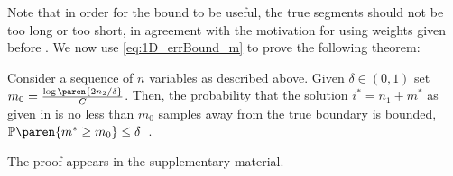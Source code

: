 Note that in order for the bound to be useful, the true segments should not be
too long or too short, in agreement with the motivation for using weights given
before .
We now use \eqref{eq:1D_errBound_m} to prove the following theorem:
\begin{theorem}\label{thm:1D_errBound}
    Consider a sequence of $n$ variables as described
    above. Given $\delta\in(0,1)$ set
    $m_0=\frac{\log\paren{2n_2/\delta}}{C}$. Then, the probability that
    the solution %
    $i^*=n_1+m^*$ as given in  %
    is no less than
    $m_0$ samples away from the true boundary is bounded,
    $\mathbb{P}\paren{m^*\geq m_0}\leq\delta$~.
\end{theorem}
The proof appears in %
the supplementary material.

